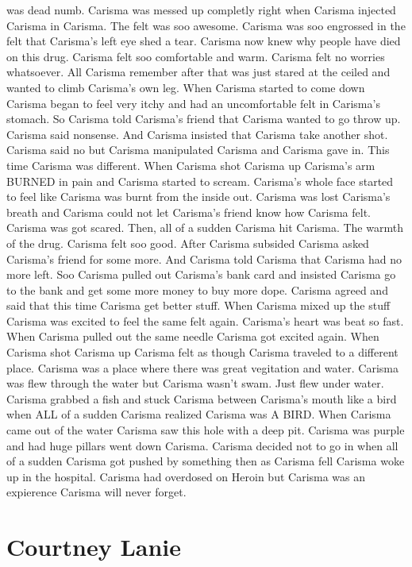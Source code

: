\documentclass[12pt]{book}
\begin{document}
was dead numb. Carisma was messed up completly right when Carisma injected Carisma in Carisma. The felt was soo awesome. Carisma was soo engrossed in the felt that Carisma's left eye shed a tear. Carisma now knew why people have died on this drug. Carisma felt soo comfortable and warm. Carisma felt no worries whatsoever. All Carisma remember after that was just stared at the ceiled and wanted to climb Carisma's own leg. When Carisma started to come down Carisma began to feel very itchy and had an uncomfortable felt in Carisma's stomach. So Carisma told Carisma's friend that Carisma wanted to go throw up. Carisma said nonsense. And Carisma insisted that Carisma take another shot. Carisma said no but Carisma manipulated Carisma and Carisma gave in. This time Carisma was different. When Carisma shot Carisma up Carisma's arm BURNED in pain and Carisma started to scream. Carisma's whole face started to feel like Carisma was burnt from the inside out. Carisma was lost Carisma's breath and Carisma could not let Carisma's friend know how Carisma felt. Carisma was got scared. Then, all of a sudden Carisma hit Carisma. The warmth of the drug. Carisma felt soo good. After Carisma subsided Carisma asked Carisma's friend for some more. And Carisma told Carisma that Carisma had no more left. Soo Carisma pulled out Carisma's bank card and insisted Carisma go to the bank and get some more money to buy more dope. Carisma agreed and said that this time Carisma get better stuff. When Carisma mixed up the stuff Carisma was excited to feel the same felt again. Carisma's heart was beat so fast. When Carisma pulled out the same needle Carisma got excited again. When Carisma shot Carisma up Carisma felt as though Carisma traveled to a different place. Carisma was a place where there was great vegitation and water. Carisma was flew through the water but Carisma wasn't swam. Just flew under water. Carisma grabbed a fish and stuck Carisma between Carisma's mouth like a bird when ALL of a sudden Carisma realized Carisma was A BIRD. When Carisma came out of the water Carisma saw this hole with a deep pit. Carisma was purple and had huge pillars went down Carisma. Carisma decided not to go in when all of a sudden Carisma got pushed by something then as Carisma fell Carisma woke up in the hospital. Carisma had overdosed on Heroin but Carisma was an expierence Carisma will never forget.



\chapter{Courtney Lanie}
\end{document}
